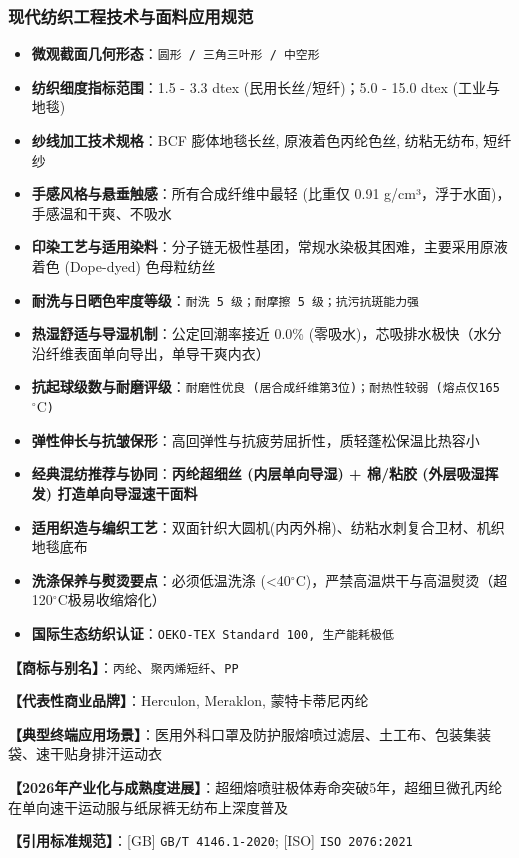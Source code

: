 \documentclass[11pt,openright,twoside,UTF8]{ctexbook}
\begin{document}
\subsubsection*{现代纺织工程技术与面料应用规范}
\begin{itemize} \setlength{\itemsep}{2pt}
    \item \textbf{微观截面几何形态}：\texttt{圆形 / 三角三叶形 / 中空形}
    \item \textbf{纺织细度指标范围}：1.5 - 3.3 dtex (民用长丝/短纤)；5.0 - 15.0 dtex (工业与地毯)
    \item \textbf{纱线加工技术规格}：BCF 膨体地毯长丝, 原液着色丙纶色丝, 纺粘无纺布, 短纤纱
    \item \textbf{手感风格与悬垂触感}：所有合成纤维中最轻 (比重仅 0.91 g/cm³，浮于水面)，手感温和干爽、不吸水
    \item \textbf{印染工艺与适用染料}：分子链无极性基团，常规水染极其困难，主要采用原液着色 (Dope-dyed) 色母粒纺丝
    \item \textbf{耐洗与日晒色牢度等级}：\texttt{耐洗 5 级；耐摩擦 5 级；抗污抗斑能力强}
    \item \textbf{热湿舒适与导湿机制}：公定回潮率接近 0.0\% (零吸水)，芯吸排水极快（水分沿纤维表面单向导出，单导干爽内衣）
    \item \textbf{抗起球级数与耐磨评级}：\texttt{耐磨性优良 (居合成纤维第3位)；耐热性较弱 (熔点仅165$^\circ\mathrm{C}$)}
    \item \textbf{弹性伸长与抗皱保形}：高回弹性与抗疲劳屈折性，质轻蓬松保温比热容小
    \item \textbf{经典混纺推荐与协同}：\textbf{丙纶超细丝 (内层单向导湿) + 棉/粘胶 (外层吸湿挥发) 打造单向导湿速干面料}
    \item \textbf{适用织造与编织工艺}：双面针织大圆机(内丙外棉)、纺粘水刺复合卫材、机织地毯底布
    \item \textbf{洗涤保养与熨烫要点}：必须低温洗涤 (\textless{}40$^\circ\mathrm{C}$)，严禁高温烘干与高温熨烫（超120$^\circ\mathrm{C}$极易收缩熔化）
    \item \textbf{国际生态纺织认证}：\texttt{OEKO-TEX Standard 100, 生产能耗极低}
\end{itemize}
\vspace{0.2cm}

\noindent\textbf{【商标与别名】}：\texttt{丙纶}、\texttt{聚丙烯短纤}、\texttt{PP}\par
\noindent\textbf{【代表性商业品牌】}：Herculon, Meraklon, 蒙特卡蒂尼丙纶\par
\noindent\textbf{【典型终端应用场景】}：医用外科口罩及防护服熔喷过滤层、土工布、包装集装袋、速干贴身排汗运动衣\par
\noindent\textbf{【2026年产业化与成熟度进展】}：超细熔喷驻极体寿命突破5年，超细旦微孔丙纶在单向速干运动服与纸尿裤无纺布上深度普及\par
\noindent\textbf{【引用标准规范】}：[GB] \texttt{GB/T 4146.1-2020}; [ISO] \texttt{ISO 2076:2021}\par
\vspace{0.5cm}
\end{document}
